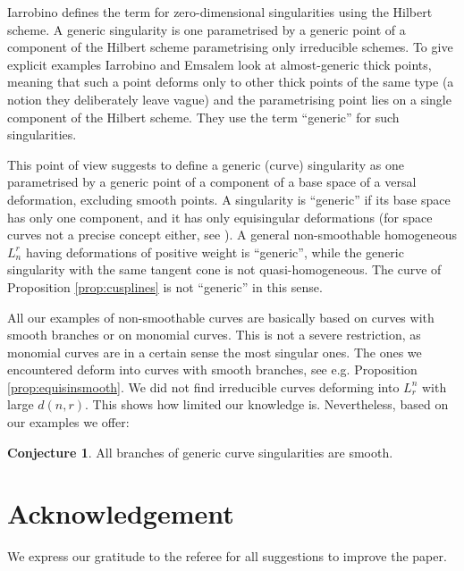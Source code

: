 \documentclass{amsart}
\theoremstyle{definition}
\newtheorem{conj}[thm]{Conjecture}
\theoremstyle{remark}
\begin{document}
Iarrobino \cite{Ia2,IE} defines the term for zero-dimensional 
singularities using the Hilbert scheme. A generic singularity is one parametrised by a
generic point of a component of the Hilbert scheme parametrising only irreducible schemes.
To give explicit examples Iarrobino and Emsalem \cite{IE} look at almost-generic thick points,
meaning that  such a point  deforms only to other thick points of the same type (a notion they 
deliberately leave vague) and the parametrising point lies on a
single component of the Hilbert scheme.  They use the term ``generic'' for such singularities.

This point of view suggests to define a generic (curve) singularity as one parame\-trised by a
generic point  of a component of a base space of a versal deformation, excluding
smooth points.  A singularity is ``generic'' if its  base space has only one component,
and it has only equisingular deformations (for space curves not a precise concept either, see \cite{BG}).
A general non-smoothable homogeneous $L_n^r$ having deformations of positive weight is 
``generic'', while the generic singularity with the same tangent cone is not quasi-homogeneous. The curve of Proposition \ref{prop:cusplines} is not ``generic'' in this sense.

All our examples of non-smoothable curves are basically based
on curves with smooth branches or on monomial curves. This is not a severe restriction, as monomial 
curves are in a certain sense the most singular ones. The ones we encountered deform into
curves with smooth branches, see e.g. Proposition \ref{prop:equisinsmooth}. We did not
find irreducible curves deforming into $L_r^n$ with large $d(n,r)$. This shows how limited our 
 knowledge is. Nevertheless, based on our examples we offer:


\begin{conj}
All branches of generic curve singularities are smooth.
\end{conj}
 

\section*{Acknowledgement}
We express our gratitude to the referee for all suggestions to improve the paper.




 
 
\end{document}
